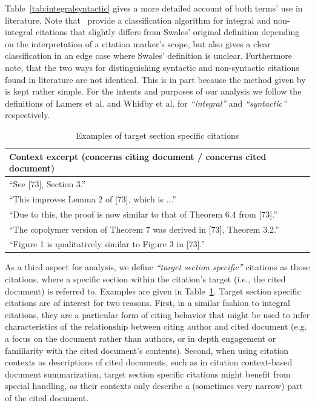 Table~\ref{tab:integralsyntactic} gives a more detailed account of both terms' use in literature. Note that~\cite{Lamers2018} provide a classification algorithm for integral and non-integral citations that slightly differs from Swales' original definition depending on the interpretation of a citation marker's scope, but also gives a clear classification in an edge case where Swales' definition is unclear. Furthermore note, that the two ways for distinguishing syntactic and non-syntactic citations found in literature are not identical. This is in part because the method given by~\cite{Abujbara2012} is kept rather simple. For the intents and purposes of our analysis we follow the definitions of Lamers et al. and Whidby et al. for \emph{``integral''} and \emph{``syntactic''} respectively.

\begin{table}
\centering
    \caption{Examples of target section specific citations}
    \label{tab:secspec}
\begin{center}
    \begin{tabular}{l}
    \toprule
    Context excerpt ({\color{UniBlue}concerns citing document} / {\color{RandomRed}concerns cited document}) \\
    \midrule
    ``See [73], {\color{RandomRed}Section 3}.'' \\
    ``This improves {\color{RandomRed}Lemma 2} of [73], which is ...'' \\
    ``Due to this, the proof is now similar to that of {\color{RandomRed}Theorem 6.4} from [73].'' \\
    ``The copolymer version of {\color{UniBlue}Theorem 7} was derived in [73], {\color{RandomRed}Theorem 3.2}.''  \\
    ``{\color{UniBlue}Figure 1} is qualitatively similar to {\color{RandomRed}Figure 3} in [73].'' \\
    \bottomrule
    \end{tabular}
\end{center}
\end{table}

As a third aspect for analysis, we define \emph{``target section specific''} citations as those citations, where a specific section within the citation's target (i.e., the cited document) is referred to. Examples are given in Table~\ref{tab:secspec}. Target section specific citations are of interest for two reasons. First, in a similar fashion to integral citations, they are a particular form of citing behavior that might be used to infer characteristics of the relationship between citing author and cited document (e.g. a focus on the document rather than authors, or in depth engagement or familiarity with the cited document's contents). Second, when using citation contexts as descriptions of cited documents, such as in citation context-based document summarization, target section specific citations might benefit from special handling, as their contexts only describe a (sometimes very narrow) part of the cited document.

